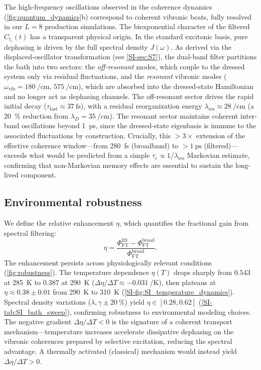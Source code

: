 \documentclass[journal=jpcl,manuscript=letter]{achemso}
\begin{document}
The high-frequency oscillations observed in the coherence dynamics (\cref{fig:quantum_dynamics}b) correspond to coherent vibronic beats, fully resolved in our $L=8$ production simulations. The biexponential character of the filtered $C_{l_1}(t)$ has a transparent physical origin. In the standard excitonic basis, pure dephasing is driven by the full spectral density $J(\omega)$. As derived via the displaced-oscillator transformation (see \cref{SI-sec:S7}), the dual-band filter partitions the bath into two sectors: the \emph{off-resonant} modes, which couple to the dressed system only via residual fluctuations, and the \emph{resonant} vibronic modes ($\omega_{\mathrm{vib}} = \SI{180}{\per\centi\meter}$, $\SI{575}{\per\centi\meter}$), which are absorbed into the dressed-state Hamiltonian and no longer act as dephasing channels. The off-resonant sector drives the rapid initial decay ($\tau_{\mathrm{fast}} \approx \SI{37}{\femto\second}$), with a residual reorganization energy $\lambda_{\mathrm{res}} \approx \SI{28}{\per\centi\meter}$ (a \SI{20}{\percent} reduction from $\lambda_D = \SI{35}{\per\centi\meter}$). The resonant sector maintains coherent inter-band oscillations beyond \SI{1}{\pico\second}, since the dressed-state eigenbasis is immune to the associated fluctuations by construction. Crucially, this $>3\times$ extension of the effective coherence window---from \SI{280}{\femto\second} (broadband) to $>\SI{1}{\pico\second}$ (filtered)---exceeds what would be predicted from a simple $\tau_c \propto 1/\lambda_{\mathrm{res}}$ Markovian estimate, confirming that non-Markovian memory effects are essential to sustain the long-lived component.


\subsection*{Environmental robustness}

We define the relative enhancement $\eta$, which quantifies the fractional gain from spectral filtering:
\begin{equation}
\eta = \frac{\Phi_{\mathrm{FT}}^{\mathrm{filt}} - \Phi_{\mathrm{FT}}^{\mathrm{broad}}}{\Phi_{\mathrm{FT}}^{\mathrm{broad}}}.
\label{eq:eta_def}
\end{equation}
The enhancement persists across physiologically relevant conditions (\cref{fig:robustness}). The temperature dependence $\eta(T)$ drops sharply from $\num{0.543}$ at \SI{285}{\kelvin} to $\num{0.387}$ at \SI{290}{\kelvin} ($\Delta\eta/\Delta T \approx \SI{-0.031}{\per\kelvin}$), then plateaus at $\eta \approx \num{0.38}\pm\num{0.01}$ from \SI{290}{\kelvin} to \SI{310}{\kelvin} (\cref{SI-fig:SI_temperature_dynamics}). Spectral density variations ($\lambda, \gamma \pm \SI{20}{\percent}$) yield $\eta \in [\num{0.28}, \num{0.62}]$ (\cref{SI-tab:SI_bath_sweep}), confirming robustness to environmental modeling choices. The negative gradient $\Delta\eta/\Delta T < 0$ is the signature of a coherent transport mechanism---temperature increases accelerate dissipative dephasing on the vibronic coherences prepared by selective excitation, reducing the spectral advantage. A thermally activated (classical) mechanism would instead yield $\Delta\eta/\Delta T > 0$.
\end{document}
